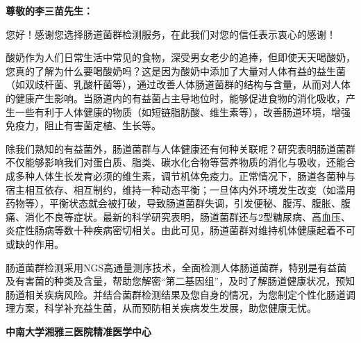 



\setlength{\arrayrulewidth}{1pt}
\fontsize{9.3pt}{17pt}\selectfont
\color{gray2}

\vspace*{10mm}
{\noindent\bf\sanhao 尊敬的李三苗先生：}

\vspace*{6mm}

您好！感谢您选择肠道菌群检测服务，在此我们对您的信任表示衷心的感谢！

酸奶作为人们日常生活中常见的食物，深受男女老少的追捧，但即使天天喝酸奶，您真的了解为什么要喝酸奶吗？这是因为酸奶中添加了大量对人体有益的益生菌（如双歧杆菌、乳酸杆菌等），通过改善人体肠道菌群的结构与含量，从而对人体的健康产生影响。当肠道内的有益菌占主导地位时，能够促进食物的消化吸收，产生一些有利于人体健康的物质（如短链脂肪酸、维生素等），改善肠道环境，增强免疫力，阻止有害菌定植、生长等。

除我们熟知的有益菌外，肠道菌群与人体健康还有何种关联呢？研究表明肠道菌群不仅能够影响我们对蛋白质、脂类、碳水化合物等营养物质的消化与吸收，还能合成多种人体生长发育必须的维生素，调节机体免疫力。正常情况下，肠道各菌种与宿主相互依存、相互制约，维持一种动态平衡；一旦体内外环境发生改变（如滥用药物等），平衡状态就会被打破，导致肠道菌群失调，引发便秘、腹泻、腹胀、腹痛、消化不良等症状。最新的科学研究表明，肠道菌群还与2型糖尿病、高血压、炎症性肠病等数十种疾病密切相关。由此可见，肠道菌群对维持机体健康起着不可或缺的作用。

肠道菌群检测采用NGS高通量测序技术，全面检测人体肠道菌群，特别是有益菌及有害菌的种类及含量，帮助您解密“第二基因组”，及时了解肠道健康状况，预知肠道相关疾病风险。并结合菌群检测结果及您自身的情况，为您制定个性化肠道调理方案，科学补充益生菌，从而预防相关疾病发生发展，助您健康无忧。

\vspace*{8mm}
\noindent\null\hfill
{\bf\sanhao 中南大学湘雅三医院精准医学中心}


